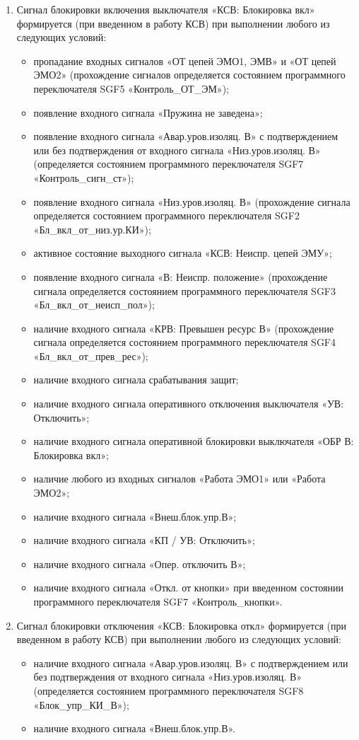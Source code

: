 \begin{enumerate}
\item
Сигнал блокировки включения выключателя «КСВ: Блокировка вкл» формируется (при введенном в работу КСВ) при выполнении любого из следующих условий:
\begin{itemize}
\sloppy
\item пропадание входных сигналов «ОТ цепей ЭМО1, ЭМВ» и «ОТ цепей ЭМО2» (прохождение сигналов определяется состоянием программного переключателя SGF5 «Контроль\_ОТ\_ЭМ»);
\item появление входного сигнала «Пружина не заведена»;
\item появление входного сигнала «Авар.уров.изоляц. В» с подтверждением или без подтверждения от входного сигнала «Низ.уров.изоляц. В» (определяется состоянием программного переключателя SGF7 «Контроль\_сигн\_ст»);
\item появление входного сигнала «Низ.уров.изоляц. В» (прохождение сигнала определяется состоянием программного переключателя SGF2 «Бл\_вкл\_от\_низ.ур.КИ»);
\item активное состояние выходного сигнала «КСВ: Неиспр. цепей ЭМУ»;
\item появление входного сигнала «В: Неиспр. положение» (прохождение сигнала определяется состоянием программного переключателя SGF3 «Бл\_вкл\_от\_неисп\_пол»);
\item наличие входного сигнала «КРВ: Превышен ресурс В» (прохождение сигнала определяется состоянием программного переключателя SGF4 «Бл\_вкл\_от\_прев\_рес»);
\item наличие входного сигнала срабатывания защит;
\item наличие входного сигнала оперативного отключения выключателя «УВ: Отключить»;
\item наличие входного сигнала оперативной блокировки выключателя «ОБР В: Блокировка вкл»; %
\item наличие любого из входных сигналов «Работа ЭМО1» или «Работа ЭМО2»;
\item наличие входного сигнала «Внеш.блок.упр.В»;
\item наличие входного сигнала «КП / УВ: Отключить»;
\item наличие входного сигнала «Опер. отключить В»;
\item наличие входного сигнала «Откл. от кнопки» при введенном состоянии программного переключателя SGF7 «Контроль\_кнопки».
\end{itemize}

\item
Сигнал блокировки отключения «КСВ: Блокировка откл» формируется (при введенном в работу КСВ) при выполнении любого из следующих условий:
\begin{itemize}
\sloppy
\item наличие входного сигнала «Авар.уров.изоляц. В» с подтверждением или без подтверждения от входного сигнала «Низ.уров.изоляц. В» (определяется состоянием программного переключателя SGF8 «Блок\_упр\_КИ\_В»);
\item наличие входного сигнала «Внеш.блок.упр.В».
\end{itemize}


\end{enumerate}
